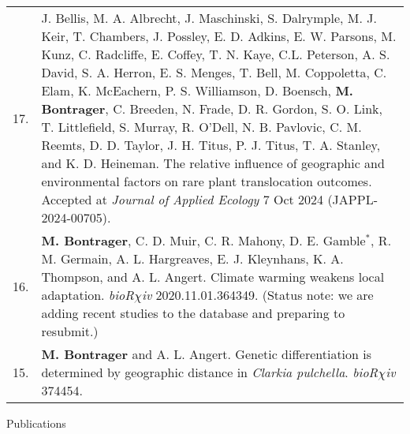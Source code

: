 \documentclass[letterpaper,11pt,oneside]{article}
\begin{document}
\def\arraystretch{1.4}
\noindent \begin{tabular}{@{} p{0.5cm} >{\raggedright\arraybackslash}p{16.7cm}}
17. & J. Bellis, M. A. Albrecht, J. Maschinski, S. Dalrymple, M. J. Keir, T. Chambers, J. Possley, E. D. Adkins, E. W. Parsons, M. Kunz, C. Radcliffe, E. Coffey, T. N. Kaye, C.L. Peterson, A. S. David, S. A. Herron, E. S. Menges, T. Bell, M. Coppoletta, C. Elam, K. McEachern, P. S. Williamson, D. Boensch, \textbf{M. Bontrager}, C. Breeden, N. Frade, D. R. Gordon, S. O. Link, T. Littlefield, S. Murray, R. O'Dell, N. B. Pavlovic, C. M. Reemts, D. D. Taylor, J. H. Titus, P. J. Titus, T. A. Stanley, and K. D. Heineman. The relative influence of geographic and environmental factors on rare plant translocation outcomes. Accepted at \textit{Journal of Applied Ecology} 7 Oct 2024 (JAPPL-2024-00705). \\ 
16. & \textbf{M. Bontrager}, C. D. Muir, C. R. Mahony, D. E. Gamble$^{*}$, R. M. Germain, A. L. Hargreaves, E. J. Kleynhans, K. A. Thompson, and A. L. Angert. Climate warming weakens local adaptation. \textit{bioR$\chi$iv} 2020.11.01.364349. (Status note: we are adding recent studies to the database and preparing to resubmit.)\\
15. & \textbf{M. Bontrager} and A. L. Angert. Genetic differentiation is determined by geographic distance in \textit{Clarkia pulchella}. \textit{bioR$\chi$iv} 374454. \\
\end{tabular}

\bigskip





\noindent\Large{Publications}  
\normalsize
\medskip
\end{document}
